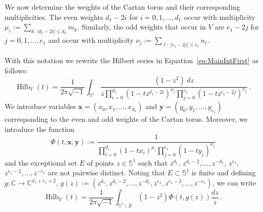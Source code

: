 \documentclass{amsart}
\theoremstyle{definition}
\theoremstyle{remark}
\newcommand{\Sp}{\mathbb{S}}
\newcommand{\bs}{\boldsymbol}
\newcommand{\Hilb}{\operatorname{Hilb}}
\begin{document}
We now determine the weights of the Cartan torus and their corresponding multiplicities. The even weights $d_1-2i$
for $i=0,1,\ldots, d_1$ occur with multiplicity $\mu_i:= \sum_{k:\:|d_1-2i|\leq d_k}m_k$.
Similarly, the odd weights that occur in $V$ are $e_1-2j$ for $j=0,1,\ldots, e_1$ and
occur with multiplicity $\nu_j:= \sum_{\ell:\:|e_1-2j|\leq e_\ell}n_\ell$.

With this  notation we rewrite the Hilbert series in Equation~\eqref{eq:MainIntFirst} as follows:
\[
    \Hilb_{V}(t)=\frac{1}{2\pi \sqrt{-1}}\int_{\Sp^1} \frac{(1-z^2)\:dz}
        {z\prod\limits_{i=0}^{d_1}(1-t z^{d_1-2i})^{\mu_i}\prod\limits_{j=0}^{e_1}(1-t z^{e_1-2j})^{\nu_j}}\:.
\]
We introduce variables $\bs{x} = (x_0,x_1,\ldots,x_{d_1})$ and $\bs{y} = (y_0,y_1,\ldots,y_{e_1})$
corresponding to the even and odd weights of the Cartan torus. Moreover, we introduce  the function
\[
    \Phi(t,\bs x, \bs y)
        :=  \frac{1}{\prod\limits_{i=0}^{d_1}(1-tx_i)^{\mu_i}\prod\limits_{j=0}^{e_1}(1-ty_j)^{\nu_j}}
\]
and the exceptional set $E$ of points $z\in\Sp^1$ such that
$z^{d_1}$, $z^{d_1-2}, \ldots, z^{-d_1}$, $z^{e_1}$, $z^{e_1-2},\ldots, z^{-e_1}$ are not pairwise distinct.
Noting that $E\subset \Sp^1$ is finite and defining $g:\mathbb C\to \mathbb C^{d_1+e_1+2}$,
$g(z):=(z^{d_1}, z^{d_1-2},\ldots, z^{-d_1},z^{e_1}, z^{e_1-2},\ldots, z^{-e_1})$, we can write
\begin{equation}
\label{eq:Phiformula}
    \Hilb_{V}(t)
    =   \frac{1}{2\pi \sqrt{-1}}\int_{\Sp^1\backslash E}(1-z^2)\Phi(t,g(z)) \frac{dz}{z} \: .
\end{equation}
\end{document}
